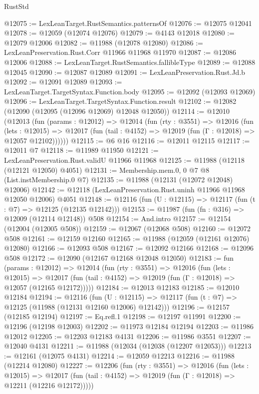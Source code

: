 \begin{lexlean}{RustStd}
\begin{coremodule}
@12075 := LexLeanTarget.RustSemantics.patternsOf
@12076 := @12075 @12041
@12078 := @12059 (@12074 @12076)
@12079 := @4143 @12018
@12080 := @12079 @12006
@12082 := @11988 (@12078 @12080)
@12086 := LexLeanPreservation.Rust.Corr @11966 @11968 @11970
@12087 := @12086 @12006
@12088 := LexLeanTarget.RustSemantics.fallibleType
@12089 := @12088 @12045
@12090 := @12087 @12089
@12091 := LexLeanPreservation.Rust.Jd.b
@12092 := @12091 @12089
@12093 := LexLeanTarget.TargetSyntax.Function.body
@12095 := @12092 (@12093 @12069)
@12096 := LexLeanTarget.TargetSyntax.Function.result
@12102 := @12082 (@12090 (@12095 (@12096 @12069) @12048 @12050))
@12114 := @12010
    (@12013
      (fun (params : @12012) =>
      @12014
        (fun (rty : @3551) =>
        @12016
          (fun (lets : @12015) =>
          @12017 (fun (tail : @4152) => @12019 (fun (Γ : @12018) => @12057 @12102))))))
@12115 := @6 @16
@12116 := @12011 @12115
@12117 := @12011 @7
@12118 := @11989 @11950
@12121 := LexLeanPreservation.Rust.validU @11966 @11968
@12125 := @11988 (@12118 (@12121 @12050) @4051)
@12131 := Membership.mem.{0, 0} @7 @8 (List.instMembership.{0} @7)
@12135 := @11988 (@12131 (@12072 @12048) @12006)
@12142 := @12118 (LexLeanPreservation.Rust.uninh @11966 @11968 @12050 @12006) @4051
@12148 := @12116 (fun (U : @12115) => @12117 (fun (t : @7) => @12125 (@12135 @12142)))
@12153 := @11987 (fun (fn : @316) => @12009 (@12114 @12148)) @508
@12154 := And.intro
@12157 := @12154 (@12004 (@12005 @508))
@12159 := @12067 (@12068 @508)
@12160 := @12072 @508
@12161 := @12159 @12160
@12165 := @11988 (@12059 (@12161 @12076) @12080)
@12166 := @12093 @508
@12167 := @12092 @12166
@12168 := @12096 @508
@12172 := @12090 (@12167 @12168 @12048 @12050)
@12183 := fun (params : @12012) =>
  @12014
    (fun (rty : @3551) =>
    @12016
      (fun (lets : @12015) =>
      @12017 (fun (tail : @4152) => @12019 (fun (Γ : @12018) => @12057 (@12165 @12172)))))
@12184 := @12013 @12183
@12185 := @12010 @12184
@12194 := @12116
    (fun (U : @12115) => @12117 (fun (t : @7) => @12125 (@11988 (@12131 @12160 @12006) @12142)))
@12196 := @12157 (@12185 @12194)
@12197 := Eq.refl.{1}
@12198 := @12197 @11991
@12200 := @12196 (@12198 @12003)
@12202 := @11973 @12184 @12194
@12203 := @11986 @12012
@12205 := @12203 @12183 @4131
@12206 := @11986 @3551
@12207 := @12040 @4131
@12211 := @11988 (@12034 (@12038 (@12207 @12053)))
@12213 := @12161 (@12075 @4131)
@12214 := @12059 @12213
@12216 := @11988 (@12214 @12080)
@12227 := @12206
    (fun (rty : @3551) =>
    @12016
      (fun (lets : @12015) =>
      @12017 (fun (tail : @4152) => @12019 (fun (Γ : @12018) => @12211 (@12216 @12172)))))

\end{coremodule}
\end{lexlean}
